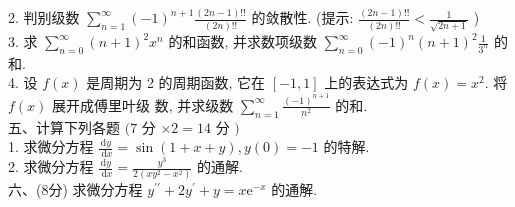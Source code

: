 \documentclass[a3paper, 11pt ,UTF8]{article}
\begin{document}
2. 判别级数 $\displaystyle\sum_{n=1}^{\infty}(-1)^{n+1} \frac{(2 n-1) ! !}{(2 n) ! !}$ 的敛散性. (提示: $\displaystyle\frac{(2 n-1) ! !}{(2 n) ! !}<\frac{1}{\sqrt{2 n+1}}$ )\\
3. 求 $\displaystyle\sum_{n=0}^{\infty}(n+1)^2 x^n$ 的和函数, 并求数项级数 $\displaystyle\sum_{n=0}^{\infty}(-1)^n(n+1)^2 \frac{1}{3^n}$ 的和.\\
4. 设 $f(x)$ 是周期为 2 的周期函数, 它在 $[-1,1]$ 上的表达式为 $f(x)=x^2$. 将 $f(x)$ 展开成傅里叶级 数, 并求级数 $\displaystyle \sum_{n=1}^{\infty} \frac{(-1)^{n+1}}{n^2}$ 的和.\\
五、计算下列各题 $(7$ 分 $\times 2=14$ 分 $)$\\
1. 求微分方程 $\displaystyle\frac{\mathrm{d} y}{\mathrm{~d} x}=\sin (1+x+y), y(0)=-1$ 的特解.\\
 2. 求微分方程 $\displaystyle\frac{\mathrm{d} y}{\mathrm{~d} x}=\frac{y^3}{2\left(x y^2-x^2\right)}$ 的通解.\\
 六、(8分) 求微分方程 $ \displaystyle y^{\prime \prime}+2 y^{\prime}+y=x \mathrm{e}^{-x}$ 的通解.\\
\end{document}
